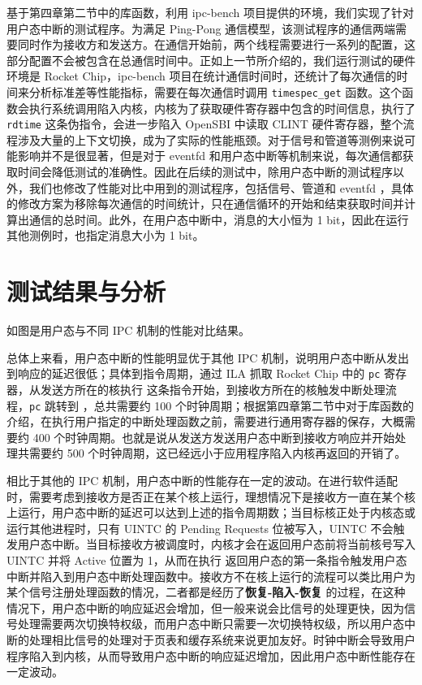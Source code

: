 基于第四章第二节中的库函数，利用 ipc-bench 项目提供的环境，我们实现了针对用户态中断的测试程序。为满足 Ping-Pong 通信模型，该测试程序的通信两端需要同时作为接收方和发送方。在通信开始前，两个线程需要进行一系列的配置，这部分配置不会被包含在总通信时间中。正如上一节所介绍的，我们运行测试的硬件环境是 Rocket Chip，ipc-bench 项目在统计通信时间时，还统计了每次通信的时间来分析标准差等性能指标，需要在每次通信时调用 \texttt{timespec\_get} 函数。这个函数会执行系统调用陷入内核，内核为了获取硬件寄存器中包含的时间信息，执行了 \texttt{rdtime} 这条伪指令，会进一步陷入 OpenSBI 中读取 CLINT 硬件寄存器，整个流程涉及大量的上下文切换，成为了实际的性能瓶颈。对于信号和管道等测例来说可能影响并不是很显著，但是对于 eventfd 和用户态中断等机制来说，每次通信都获取时间会降低测试的准确性。因此在后续的测试中，除用户态中断的测试程序以外，我们也修改了性能对比中用到的测试程序，包括信号、管道和 eventfd ，具体的修改方案为移除每次通信的时间统计，只在通信循环的开始和结束获取时间并计算出通信的总时间。此外，在用户态中断中，消息的大小恒为 1 bit，因此在运行其他测例时，也指定消息大小为 1 bit。

\section{测试结果与分析}

如图是用户态与不同 IPC 机制的性能对比结果。

总体上来看，用户态中断的性能明显优于其他 IPC 机制，说明用户态中断从发出到响应的延迟很低；具体到指令周期，通过 ILA 抓取 Rocket Chip 中的 \texttt{pc} 寄存器，从发送方所在的核执行 \Iuipisend 这条指令开始，到接收方所在的核触发中断处理流程，\texttt{pc} 跳转到 \Rutvec ，总共需要约 100 个时钟周期；根据第四章第二节中对于库函数的介绍，在执行用户指定的中断处理函数之前，需要进行通用寄存器的保存，大概需要约 400 个时钟周期。也就是说从发送方发送用户态中断到接收方响应并开始处理共需要约 500 个时钟周期，这已经远小于应用程序陷入内核再返回的开销了。

相比于其他的 IPC 机制，用户态中断的性能存在一定的波动。在进行软件适配时，需要考虑到接收方是否正在某个核上运行，理想情况下是接收方一直在某个核上运行，用户态中断的延迟可以达到上述的指令周期数；当目标核正处于内核态或运行其他进程时，只有 UINTC 的 Pending Requests 位被写入，UINTC 不会触发用户态中断。当目标接收方被调度时，内核才会在返回用户态前将当前核号写入 UINTC 并将 Active 位置为 1，从而在执行 \Isret 返回用户态的第一条指令触发用户态中断并陷入到用户态中断处理函数中。接收方不在核上运行的流程可以类比用户为某个信号注册处理函数的情况，二者都是经历了\textbf{恢复-陷入-恢复} 的过程，在这种情况下，用户态中断的响应延迟会增加，但一般来说会比信号的处理更快，因为信号处理需要两次切换特权级，而用户态中断只需要一次切换特权级，所以用户态中断的处理相比信号的处理对于页表和缓存系统来说更加友好。时钟中断会导致用户程序陷入到内核，从而导致用户态中断的响应延迟增加，因此用户态中断性能存在一定波动。

